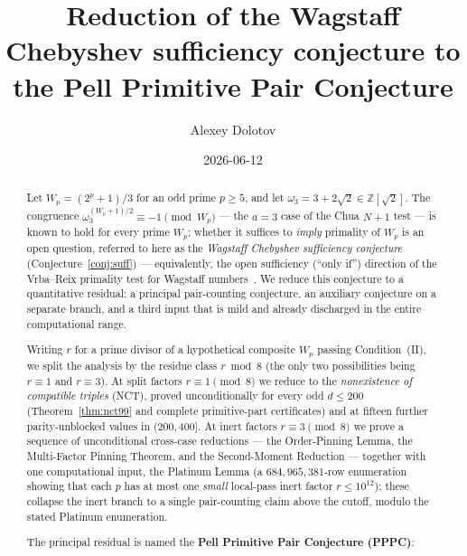 \documentclass[11pt]{amsart}
\theoremstyle{plain}
\theoremstyle{definition}
\theoremstyle{remark}
\numberwithin{equation}{section}
\newcommand{\Z}{\mathbb{Z}}
\begin{document}
\title[Wagstaff Chebyshev reduction to PPPC]{Reduction of the Wagstaff Chebyshev sufficiency conjecture to the Pell Primitive Pair Conjecture}

\author{Alexey Dolotov}
\date{2026-06-12}


\begin{abstract}
Let $W_p = (2^p + 1)/3$ for an odd prime $p \geq 5$, and let $\omega_3 = 3 + 2\sqrt{2} \in \Z[\sqrt 2]$. The congruence $\omega_3^{(W_p + 1)/2} \equiv -1 \pmod{W_p}$ --- the $a = 3$ case of the Chua $N + 1$ test --- is known to hold for every prime $W_p$; whether it suffices to \emph{imply} primality of $W_p$ is an open question, referred to here as the \emph{Wagstaff Chebyshev sufficiency conjecture} (Conjecture~\ref{conj:suff}) --- equivalently, the open sufficiency (``only if'') direction of the Vrba--Reix primality test for Wagstaff numbers~\cite{ref:VrbaReix}. We reduce this conjecture to a quantitative residual: a principal pair-counting conjecture, an auxiliary conjecture on a separate branch, and a third input that is mild and already discharged in the entire computational range.

Writing $r$ for a prime divisor of a hypothetical composite $W_p$ passing Condition~(II), we split the analysis by the residue class $r \bmod 8$ (the only two possibilities being $r \equiv 1$ and $r \equiv 3$). At split factors $r \equiv 1 \pmod 8$ we reduce to the \emph{nonexistence of compatible triples} (NCT), proved unconditionally for every odd $d \leq 200$ (Theorem~\ref{thm:nct99} and complete primitive-part certificates) and at fifteen further parity-unblocked values in $(200, 400]$. At inert factors $r \equiv 3 \pmod 8$ we prove a sequence of unconditional cross-case reductions --- the Order-Pinning Lemma, the Multi-Factor Pinning Theorem, and the Second-Moment Reduction --- together with one computational input, the Platinum Lemma (a $684{,}965{,}381$-row enumeration showing that each $p$ has at most one \emph{small} local-pass inert factor $r \leq 10^{12}$); these collapse the inert branch to a single pair-counting claim above the cutoff, modulo the stated Platinum enumeration.

The principal residual is named the \textbf{Pell Primitive Pair Conjecture (PPPC)}:


\end{abstract}
\end{document}
